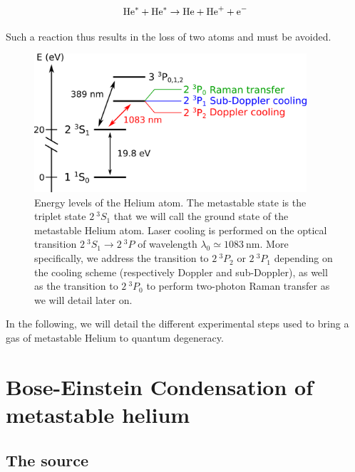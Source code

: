 \begin{equation}
    \mathrm{He}^* + \mathrm{He}^* \rightarrow \mathrm{He} + \mathrm{He}^+ + \mathrm{e}^{-}
\end{equation}

Such a reaction thus results in the loss of two atoms and must be avoided. 

\begin{figure}
    \centering
    \includegraphics[width=0.9\textwidth]{Fig/Chapter3/niveaux.png}
    \caption{Energy levels of the Helium atom. The metastable state is the triplet state $2 \ ^3S_1$ that we will call the ground state of the metastable Helium atom. Laser cooling is performed on the optical transition $2 \ ^3S_1 \rightarrow 2 \ ^3 P$ of wavelength $\lambda_0 \simeq 1083 \ \mathrm{nm}$. More specifically, we address the transition to  $2 \ ^3 P_2$ or $2 \ ^3 P_1$ depending on the cooling scheme (respectively Doppler and sub-Doppler), as well as the transition to  $2 \ ^3 P_0$ to perform two-photon Raman transfer as we will detail later on.}
    \label{fig:niveaux}
\end{figure}

In the following, we will detail the different experimental steps used to bring a gas of metastable Helium to quantum degeneracy.

\section{Bose-Einstein Condensation of metastable helium}

\subsection{The source}

